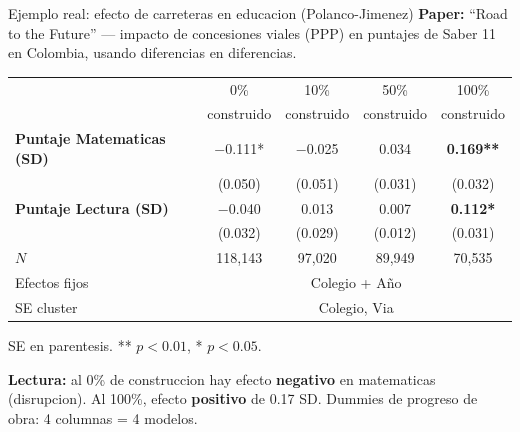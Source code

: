 \documentclass[aspectratio=169, 11pt]{beamer}
\begin{document}
\begin{frame}{Ejemplo real: efecto de carreteras en educacion (Polanco-Jimenez)}
\small
\textbf{Paper:} ``Road to the Future'' --- impacto de concesiones viales (PPP) en puntajes de Saber 11 en Colombia, usando diferencias en diferencias.

\vspace{0.1cm}
\begin{center}
\scriptsize
\begin{tabular}{lcccc}
\toprule
& 0\% & 10\% & 50\% & 100\% \\
& construido & construido & construido & construido \\
\midrule
\textbf{Puntaje Matematicas (SD)} & $-$0.111* & $-$0.025 & 0.034 & \textbf{0.169**} \\
& (0.050) & (0.051) & (0.031) & (0.032) \\[3pt]
\textbf{Puntaje Lectura (SD)} & $-$0.040 & 0.013 & 0.007 & \textbf{0.112*} \\
& (0.032) & (0.029) & (0.012) & (0.031) \\
\midrule
$N$ & 118{,}143 & 97{,}020 & 89{,}949 & 70{,}535 \\
Efectos fijos & \multicolumn{4}{c}{Colegio + A\~no} \\
SE cluster & \multicolumn{4}{c}{Colegio, Via} \\
\bottomrule
\end{tabular}
\end{center}
\footnotesize SE en parentesis. ** $p<0.01$, * $p<0.05$.

\vspace{0.1cm}
\small \textbf{Lectura:} al 0\% de construccion hay efecto \textbf{negativo} en matematicas (disrupcion). Al 100\%, efecto \textbf{positivo} de 0.17 SD. Dummies de progreso de obra: 4 columnas = 4 modelos.
\end{frame}
\end{document}
